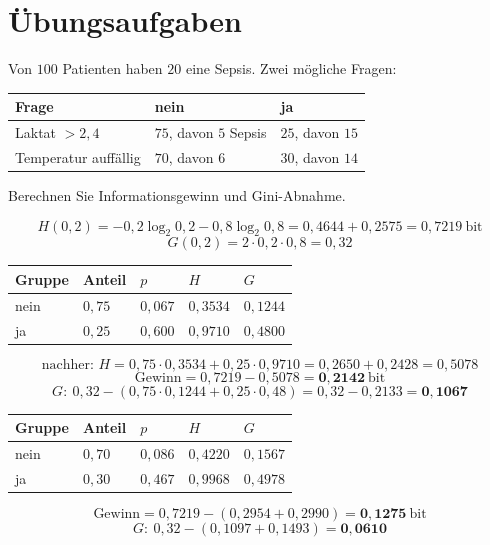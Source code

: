 \section{Übungsaufgaben}

\begin{aufgabe}
Von $100$ Patienten haben $20$ eine Sepsis. Zwei mögliche Fragen:
\begin{center}
{\small
\renewcommand{\arraystretch}{1.5}
\begin{tabular}{@{}P{2.6cm}P{2.6cm}P{2.6cm}@{}}
\toprule
\textbf{Frage} & \textbf{nein} & \textbf{ja}\\
\midrule
Laktat $> 2{,}4$ & $75$, davon $5$ Sepsis & $25$, davon $15$\\
Temperatur auffällig & $70$, davon $6$ & $30$, davon $14$\\
\bottomrule
\end{tabular}}
\end{center}
Berechnen Sie Informationsgewinn und Gini-Abnahme.

\loesung
{}
\[ H(0{,}2) = -0{,}2\log_2 0{,}2 - 0{,}8\log_2 0{,}8 = 0{,}4644 + 0{,}2575 = 0{,}7219 \ \text{bit} \]
\[ G(0{,}2) = 2\cdot0{,}2\cdot0{,}8 = 0{,}32 \]

\begin{center}
{\small
\renewcommand{\arraystretch}{1.48}
\begin{tabular}{@{}P{1.6cm}P{1.4cm}P{1.6cm}P{1.8cm}P{1.6cm}@{}}
\toprule
\textbf{Gruppe} & \textbf{Anteil} & $p$ & $H$ & $G$\\
\midrule
nein & $0{,}75$ & $0{,}067$ & $0{,}3534$ & $0{,}1244$\\
ja & $0{,}25$ & $0{,}600$ & $0{,}9710$ & $0{,}4800$\\
\bottomrule
\end{tabular}}
\end{center}
\[ \text{nachher: } H = 0{,}75\cdot0{,}3534 + 0{,}25\cdot0{,}9710 = 0{,}2650+0{,}2428 = 0{,}5078 \]
\[ \text{Gewinn} = 0{,}7219 - 0{,}5078 = \mathbf{0{,}2142} \ \text{bit} \]
\[ G: \ 0{,}32 - (0{,}75\cdot0{,}1244 + 0{,}25\cdot0{,}48) = 0{,}32 - 0{,}2133 = \mathbf{0{,}1067} \]

\begin{center}
{\small
\renewcommand{\arraystretch}{1.48}
\begin{tabular}{@{}P{1.6cm}P{1.4cm}P{1.6cm}P{1.8cm}P{1.6cm}@{}}
\toprule
\textbf{Gruppe} & \textbf{Anteil} & $p$ & $H$ & $G$\\
\midrule
nein & $0{,}70$ & $0{,}086$ & $0{,}4220$ & $0{,}1567$\\
ja & $0{,}30$ & $0{,}467$ & $0{,}9968$ & $0{,}4978$\\
\bottomrule
\end{tabular}}
\end{center}
\[ \text{Gewinn} = 0{,}7219 - (0{,}2954 + 0{,}2990) = \mathbf{0{,}1275} \ \text{bit} \]
\[ G: \ 0{,}32 - (0{,}1097 + 0{,}1493) = \mathbf{0{,}0610} \]


\end{aufgabe}
